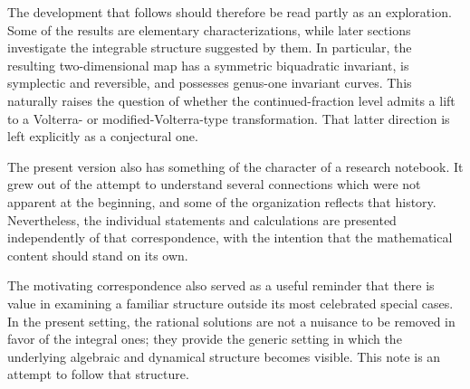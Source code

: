 \documentclass[11pt]{article}
\theoremstyle{remark}
\begin{document}
The development that follows should therefore be read partly as an exploration. Some of the results are elementary characterizations, while later sections investigate the integrable structure suggested by them. In particular, the resulting two-dimensional map has a symmetric biquadratic invariant, is symplectic and reversible, and possesses genus-one invariant curves. This naturally raises the question of whether the continued-fraction level admits a lift to a Volterra- or modified-Volterra-type transformation. That latter direction is left explicitly as a conjectural one.

The present version also has something of the character of a research notebook. It grew out of the attempt to understand several connections which were not apparent at the beginning, and some of the organization reflects that history. Nevertheless, the individual statements and calculations are presented independently of that correspondence, with the intention that the mathematical content should stand on its own.

The motivating correspondence also served as a useful reminder that there is value in examining a familiar structure outside its most celebrated special cases. In the present setting, the rational solutions are not a nuisance to be removed in favor of the integral ones; they provide the generic setting in which the underlying algebraic and dynamical structure becomes visible. This note is an attempt to follow that structure.
\end{document}
